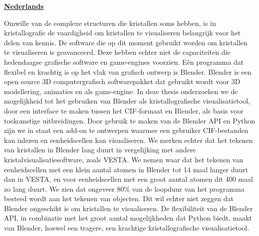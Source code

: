 \textbf{\underline{Nederlands}}
\par
Omwille van de complexe structuren die kristallen soms hebben, is in kristallografie de vaardigheid om kristallen te visualiseren belangrijk voor het delen van kennis. De software die op dit moment gebruikt worden om kristallen te visualiseren is geavanceerd. Deze hebben echter niet de capaciteiten die hedendaagse grafische software en game-engines voorzien. Eén programma dat flexibel en krachtig is op het vlak van grafisch ontwerp is Blender. Blender is een open source 3D computergrafisch softwarepakket dat gebruikt wordt voor 3D modellering, animaties en als game-engine. In deze thesis onderzoeken we de mogelijkheid tot het gebruiken van Blender als kristallografische visualisatietool, door een interface te maken tussen het CIF-formaat en Blender, als basis voor toekomstige uitbreidingen. Door gebruik te maken van de Blender API en Python zijn we in staat een add-on te ontwerpen waarmee een gebruiker CIF-bestanden kan inlezen en eenheidscellen kan visualiseren. We merken echter dat het tekenen van kristallen in Blender lang duurt in vergelijking met andere kristalvisualisatiesoftware, zoals VESTA. We nemen waar dat het tekenen van eenheidscellen met een klein aantal atomen in Blender tot 14 maal langer duurt dan in VESTA, en voor eenheidscellen met een groot aantal atomen dit 400 maal zo lang duurt. We zien dat ongeveer 80\% van de loopduur van het programma besteed wordt aan het tekenen van objecten. Dit wil echter niet zeggen dat Blender ongeschikt is om kristallen te visualiseren. De flexibiliteit van de Blender API, in combinatie met het groot aantal mogelijkheden dat Python biedt, maakt van Blender, hoewel een tragere, een krachtige kristallografische visualisatietool. 

